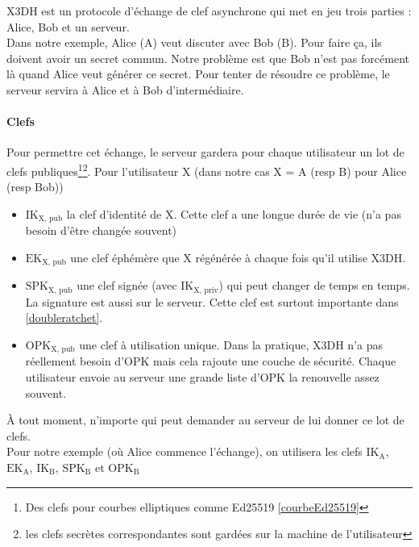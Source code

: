\documentclass[a4paper, 12pt]{article}
\begin{document}
X3DH est un protocole d'échange de clef asynchrone qui met en jeu trois parties : Alice, Bob et un serveur. \\
Dans notre exemple, Alice (A) veut discuter avec Bob (B). Pour faire ça, ils doivent avoir un secret commun. Notre problème est que Bob n'est pas forcément là quand Alice veut générer ce secret. Pour tenter de résoudre ce problème, le serveur servira à Alice et à Bob d'intermédiaire.

\paragraph{Clefs}
Pour permettre cet échange, le serveur gardera pour chaque utilisateur un lot de clefs publiques\footnote{Des clefs pour courbes elliptiques comme Ed25519 \ref{courbeEd25519}}\footnote{les clefs secrètes correspondantes sont gardées sur la machine de l'utilisateur}. 
Pour l'utilisateur X (dans notre cas X = A (resp B) pour Alice (resp Bob))
\begin{itemize}
	\item $\text{IK}_{\text{X, pub}}$ la clef d'identité de X. Cette clef a une longue durée de vie (n'a pas besoin d'être changée souvent)
	\item $\text{EK}_{\text{X, pub}}$ une clef éphémère que X régénérée à chaque fois qu'il utilise X3DH.
	\item $\text{SPK}_{\text{X, pub}}$ une clef signée (avec $\text{IK}_{\text{X, priv}}$) qui peut changer de temps en temps. La signature est aussi sur le serveur. Cette clef est surtout importante dans \ref{doubleratchet}. 
	\item $\text{OPK}_{\text{X, pub}}$ une clef à utilisation unique. Dans la pratique, X3DH n'a pas réellement besoin d'OPK mais cela rajoute une couche de sécurité. Chaque utilisateur envoie au serveur une grande liste d'OPK la renouvelle assez souvent.
\end{itemize}
À tout moment, n'importe qui peut demander au serveur de lui donner ce lot de clefs.\\

Pour notre exemple (où Alice commence l'échange), on utilisera les clefs $\text{IK}_{\text{A}}$, $\text{EK}_{\text{A}}$, $\text{IK}_{\text{B}}$, $\text{SPK}_{\text{B}}$ et $\text{OPK}_{\text{B}}$
\end{document}
